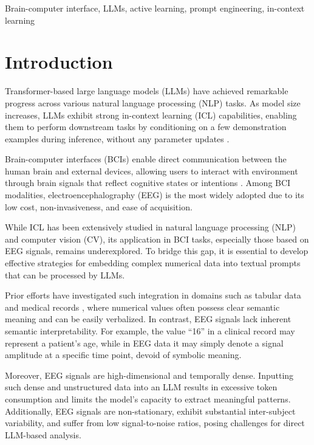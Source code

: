 \documentclass[journal,twocolumn]{IEEEtran}
\begin{document}
\begin{IEEEkeywords}
Brain-computer interface, LLMs, active learning, prompt engineering, in-context learning
\end{IEEEkeywords}

\IEEEpeerreviewmaketitle

\section{Introduction}

Transformer-based large language models (LLMs) \cite{vaswani2017attention} have achieved remarkable progress across various natural language processing (NLP) tasks. As model size increases, LLMs exhibit strong in-context learning (ICL) capabilities, enabling them to perform downstream tasks by conditioning on a few demonstration examples during inference, without any parameter updates \cite{brown2020language}.

Brain-computer interfaces (BCIs) \cite{Lance2012, Wolpaw2002} enable direct communication between the human brain and external devices, allowing users to interact with environment through brain signals that reflect cognitive states or intentions \cite{he2019transfer}. Among BCI modalities, electroencephalography (EEG) is the most widely adopted due to its low cost, non-invasiveness, and ease of acquisition.

While ICL has been extensively studied in natural language processing (NLP) and computer vision (CV), its application in BCI tasks, especially those based on EEG signals, remains underexplored. To bridge this gap, it is essential to develop effective strategies for embedding complex numerical data into textual prompts that can be processed by LLMs.

Prior efforts have investigated such integration in domains such as tabular data \cite{hegselmann2023tabllm, liu2025umman} and medical records \cite{liu2023large}, where numerical values often possess clear semantic meaning and can be easily verbalized. In contrast, EEG signals lack inherent semantic interpretability. For example, the value “16” in a clinical record may represent a patient’s age, while in EEG data it may simply denote a signal amplitude at a specific time point, devoid of symbolic meaning.

Moreover, EEG signals are high-dimensional and temporally dense. Inputting such dense and unstructured data into an LLM results in excessive token consumption and limits the model’s capacity to extract meaningful patterns. Additionally, EEG signals are non-stationary, exhibit substantial inter-subject variability, and suffer from low signal-to-noise ratios, posing challenges for direct LLM-based analysis.
\end{document}
